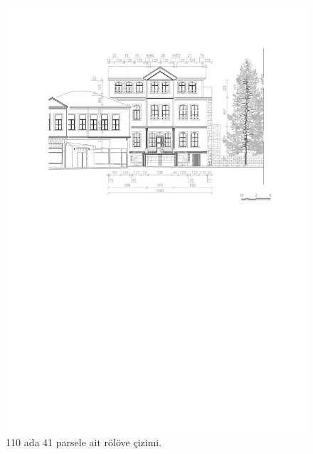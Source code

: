 \begin{figure}
\centering
\includegraphics[width=1\textwidth,height=\textheight]{source/figures/Roloveler/R110-41.pdf}
\caption{110 ada 41 parsele ait rölöve çizimi.}
\end{figure}

